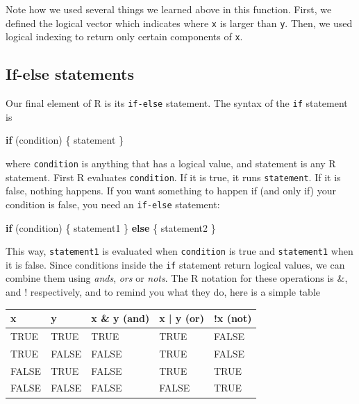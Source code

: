 \documentclass[
]{book}
\newenvironment{Shaded}{\begin{snugshade}}{\end{snugshade}}
\newcommand{\ControlFlowTok}[1]{\textcolor[rgb]{0.13,0.29,0.53}{\textbf{#1}}}
\newcommand{\NormalTok}[1]{#1}
\theoremstyle{definition}
\theoremstyle{definition}
\theoremstyle{definition}
\theoremstyle{definition}
\theoremstyle{remark}
\begin{document}
Note how we used several things we learned above in this function. First, we defined the logical vector which indicates where \texttt{x} is larger than \texttt{y}. Then, we used logical indexing to return only certain components of \texttt{x}.

\hypertarget{if-else-statements}{%
\subsection{If-else statements}\label{if-else-statements}}

Our final element of R is its \texttt{if-else} statement. The syntax of the \texttt{if} statement is

\begin{Shaded}
\begin{Highlighting}[]
\ControlFlowTok{if}\NormalTok{ (condition) \{}
\NormalTok{    statement}
\NormalTok{\}}
\end{Highlighting}
\end{Shaded}

where \texttt{condition} is anything that has a logical value, and statement is any R statement. First R evaluates \texttt{condition}. If it is true, it runs \texttt{statement}. If it is false, nothing happens. If you want something to happen if (and only if) your condition is false, you need an \texttt{if-else} statement:

\begin{Shaded}
\begin{Highlighting}[]
\ControlFlowTok{if}\NormalTok{ (condition) \{}
\NormalTok{    statement1}
\NormalTok{\} }\ControlFlowTok{else}\NormalTok{ \{}
\NormalTok{    statement2}
\NormalTok{\}}
\end{Highlighting}
\end{Shaded}

This way, \texttt{statement1} is evaluated when \texttt{condition} is true and \texttt{statement1} when it is false. Since conditions inside the \texttt{if} statement return logical values, we can combine them using \emph{ands}, \emph{ors} or \emph{nots}. The R notation for these operations is \&, \textbar{} and ! respectively, and to remind you what they do, here is a simple table

\begin{tabular}{l|l|l|l|l}
\hline
x & y & x \& y (and) & x | y (or) & !x (not)\\
\hline
TRUE & TRUE & TRUE & TRUE & FALSE\\
\hline
TRUE & FALSE & FALSE & TRUE & FALSE\\
\hline
FALSE & TRUE & FALSE & TRUE & TRUE\\
\hline
FALSE & FALSE & FALSE & FALSE & TRUE\\
\hline
\end{tabular}
\end{document}
